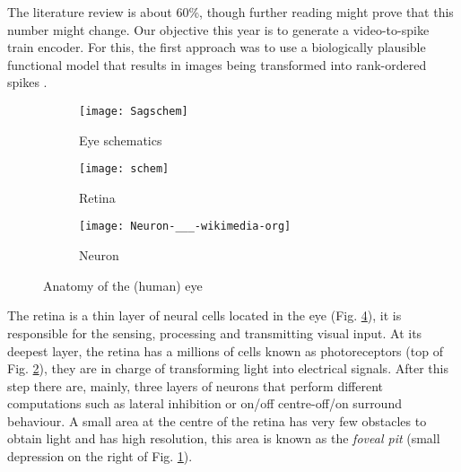 The literature review is about 60\%, though further reading might prove that 
this number might change. Our objective this year is to generate a 
video-to-spike train encoder. For this, the first approach was to use a
biologically plausible functional model \cite{basab-model} that results in
images being transformed into rank-ordered spikes 
\cite{thorpe-spike-rapid-processing}.

\begin{figure}[hbt]
  \centering
  \begin{subfigure}[b]{0.15\textwidth}
    \centering
    \texttt{[image: Sagschem]}
    \caption{Eye schematics}
    \label{sub-fig-eye-schematics}
  \end{subfigure}
  \begin{subfigure}[b]{0.15\textwidth}
    \centering
    \texttt{[image: schem]}
    \caption{Retina}
    \label{sub-fig-retinal-layers}
  \end{subfigure}
  \begin{subfigure}[b]{0.15\textwidth}
    \centering
    \texttt{[image: Neuron-\_\_\_-wikimedia-org]}
    \caption{Neuron}
    \label{sub-fig-neuron}
  \end{subfigure}
  
  \caption{Anatomy of the (human) eye }
  \label{fig-basic-eye-anatomy}
\end{figure}

The retina is a thin layer of neural cells located in the eye (Fig. 
\ref{fig-basic-eye-anatomy}), it is responsible
for the sensing, processing and transmitting visual input\cite{webvision}. 
At its deepest layer, the retina has a millions of cells known as 
photoreceptors (top of Fig. \ref{sub-fig-retinal-layers}), they are in charge 
of transforming light into electrical 
signals. After this step there are, mainly, three layers of neurons that 
perform different computations such as lateral inhibition or on/off 
centre-off/on surround behaviour\cite{webvision, basab-model}. A small area 
at the centre of the retina has very few obstacles to obtain light and has high
resolution, this area is known as the \emph{foveal pit} (small depression on 
the right of Fig. \ref{sub-fig-eye-schematics}).

